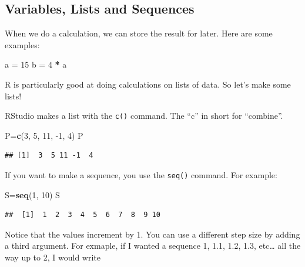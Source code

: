 \documentclass[
]{book}
\newenvironment{Shaded}{\begin{snugshade}}{\end{snugshade}}
\newcommand{\DecValTok}[1]{\textcolor[rgb]{0.00,0.00,0.81}{#1}}
\newcommand{\KeywordTok}[1]{\textcolor[rgb]{0.13,0.29,0.53}{\textbf{#1}}}
\newcommand{\NormalTok}[1]{#1}
\newcommand{\OperatorTok}[1]{\textcolor[rgb]{0.81,0.36,0.00}{\textbf{#1}}}
\newcommand{\StringTok}[1]{\textcolor[rgb]{0.31,0.60,0.02}{#1}}
\begin{document}
\hypertarget{variables-lists-and-sequences}{%
\subsection{Variables, Lists and Sequences}\label{variables-lists-and-sequences}}

When we do a calculation, we can store the result for later. Here are some examples:

\begin{Shaded}
\begin{Highlighting}[]
\NormalTok{a =}\StringTok{ }\DecValTok{15}
\NormalTok{b =}\StringTok{ }\DecValTok{4} \OperatorTok{*}\StringTok{ }\NormalTok{a}
\end{Highlighting}
\end{Shaded}

R is particularly good at doing calculations on lists of data. So let's make some lists!

RStudio makes a list with the \texttt{c()} command. The ``c'' in short for ``combine''.

\begin{Shaded}
\begin{Highlighting}[]
\NormalTok{P=}\KeywordTok{c}\NormalTok{(}\DecValTok{3}\NormalTok{, }\DecValTok{5}\NormalTok{, }\DecValTok{11}\NormalTok{, }\DecValTok{-1}\NormalTok{, }\DecValTok{4}\NormalTok{)}
\NormalTok{P}
\end{Highlighting}
\end{Shaded}

\begin{verbatim}
## [1]  3  5 11 -1  4
\end{verbatim}

If you want to make a sequence, you use the \texttt{seq()} command. For example:

\begin{Shaded}
\begin{Highlighting}[]
\NormalTok{S=}\KeywordTok{seq}\NormalTok{(}\DecValTok{1}\NormalTok{, }\DecValTok{10}\NormalTok{)}
\NormalTok{S}
\end{Highlighting}
\end{Shaded}

\begin{verbatim}
##  [1]  1  2  3  4  5  6  7  8  9 10
\end{verbatim}

Notice that the values increment by 1. You can use a different step size by adding a third argument.
For exmaple, if I wanted a sequence 1, 1.1, 1.2, 1.3, etc\ldots{} all the way up to 2, I would write
\end{document}
